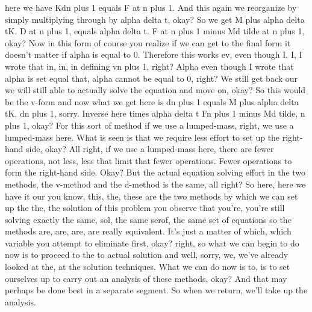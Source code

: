 \documentclass[10pt]{article}
\begin{document}
here we have Kdn plus 1 equals F at n plus 1. And this again we reorganize by simply multiplying through by alpha delta t, okay? So we get M plus alpha delta tK. D at n plus 1, equals alpha delta t. F at n plus 1 minus Md tilde at n plus 1, okay? Now in this form of course you realize if we can get to the final form it doesn't matter if alpha is equal to 0. Therefore this works ev, even though I, I, I wrote that in, in, in defining vn plus 1, right? Alpha even though I wrote that alpha is set equal that, alpha cannot be equal to 0, right? We still get back our we will still able to actually solve the equation and move on, okay? So this would be the v-form and now what we get here is dn plus 1 equals M plus alpha delta tK, dn plus 1, sorry. Inverse here times alpha delta t Fn plus 1 minus Md tilde, n plus 1, okay? For this sort of method if we use a lumped-mass, right, we use a lumped-mass here. What is seen is that we require less effort to set up the right-hand side, okay? All right, if we use a lumped-mass here, there are fewer operations, not less, less that limit that fewer operations. Fewer operations to form the right-hand side. Okay? But the actual equation solving effort in the two methods, the v-method and the d-method is the same, all right? So here, here we have it our you know, this, the, these are the two methods by which we can set up the the, the solution of this problem you observe that you're, you're still solving exactly the same, sol, the same serof, the same set of equations so the methods are, are, are, are really equivalent. It's just a matter of which, which variable you attempt to eliminate first, okay?  right, so what we can begin to do now is to proceed to the to actual solution and well, sorry, we, we've already looked at the, at the solution techniques. What we can do now is to, is to set ourselves up to carry out an analysis of these methods, okay? And that may perhaps be done best in a separate segment. So when we return, we'll take up the analysis.
\end{document}
